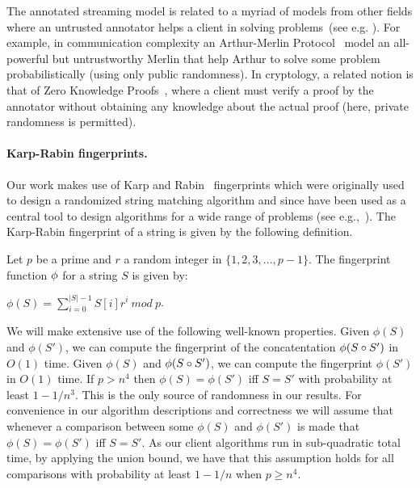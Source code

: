 The annotated streaming model is related to a myriad of models from other fields where an untrusted annotator helps a client in solving problems~(see e.g. \cite{goos2015zero, babai1985trading, goldwasser1986private, goldwasser1985knowledge, goldreich1991proofs}). For example, in communication complexity an Arthur-Merlin Protocol~\cite{babai1985trading, goldwasser1986private} model an all-powerful but untrustworthy Merlin that help Arthur to solve some problem probabilistically (using only public randomness).
In cryptology, a related notion is that of Zero Knowledge Proofs~\cite{goldwasser1985knowledge, goldreich1991proofs}, where a client must verify a proof by the annotator without obtaining any knowledge about the actual proof (here, private randomness is permitted). 


\paragraph{Karp-Rabin fingerprints.} Our work makes use of Karp and Rabin~\cite{karp1987efficient} fingerprints which were originally used to design a randomized string matching algorithm and since have been used as a central tool to design algorithms for a wide range of problems (see e.g.,~\cite{cole2003faster, kalai2002efficient, porat2009exact}). The Karp-Rabin fingerprint of a string is given by the following definition.

\begin{definition}
Let $p$ be a prime and $r$ a random integer in $\{1,2,3,...,p-1\}$. The fingerprint function $\phi$ for a string $S$ is given by:
\begin{center}
 $\phi(S)=\sum_{i=0}^{|S|-1} S[i]r^i ~mod~ p$.
\end{center}
\end{definition}

We will make extensive use of the following well-known properties. Given $\phi(S)$ and $\phi(S')$, we can compute the fingerprint of the concatentation $\phi(S \circ S')$ in $O(1)$ time. Given $\phi(S)$ and $\phi(S \circ S')$, we can compute the fingerprint $\phi(S')$ in $O(1)$ time. If $p>n^4$ then $\phi(S)=\phi(S')$ iff $S=S'$ with probability at least $1-1/n^3$. This is the only source of randomness in our results. For convenience in our algorithm descriptions and correctness we will assume that whenever a comparison between some $\phi(S)$ and  $\phi(S')$ is made that  $\phi(S)=\phi(S')$ iff  $S=S'$. As our client algorithms run in sub-quadratic total time, by applying the union bound, we have that this assumption holds for all comparisons with probability at least $1-1/n$ when $p \geq n^4$.




